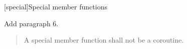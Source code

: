 
\setcounter{chapter}{11}
[special]{Special member functions}

Add paragraph 6.

\begin{quote}
	\setcounter{Paras}{5}
	\pnum
	A special member function shall not be a coroutine.
\end{quote}
